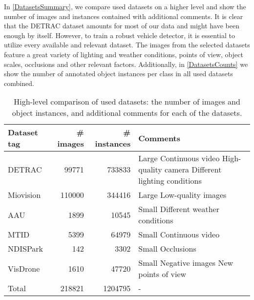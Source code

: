 In \autoref{DatasetsSummary}, we compare used datasets on a higher level and
show the number of images and instances contained with additional comments. It
is clear that the DETRAC dataset amounts for most of our
data and might have been enough by itself. However, to train a robust vehicle detector,
it is essential to utilize every available and relevant dataset. The
images from the selected datasets feature a great variety of lighting and
weather conditions, points of view, object scales, occlusions and other relevant factors.
Additionally, in \autoref{DatasetsCounts} we show the number of annotated object
instances per class in all used datasets combined.

\begin{table}[t]
\centering
\begin{tabular}{|l|rr|p{5cm}|}
    \hline
    Dataset tag & \# images & \# instances & Comments \\
    \hline
    DETRAC      &  \num{99771}  & \num{733833} & Large \newline Continuous video \newline High-quality camera \newline Different lighting conditions \\
    \hline
    Miovision   &  \num{110000} & \num{344416} & Large \newline Low-quality images \\
    \hline
    AAU         &    \num{1899} &  \num{10545} & Small \newline Different weather conditions \\
    \hline
    MTID        &    \num{5399} &  \num{64979} & Small \newline Continuous video \\
    \hline
    NDISPark    &     \num{142} &   \num{3302} & Small \newline Occlusions \\
    \hline
    VisDrone    &    \num{1610} &  \num{47720} & Small \newline Negative images \newline New points of view \\
    \hline
    \hline
    Total       &  \num{218821} & \num{1204795} & - \\
    \hline
\end{tabular}
\caption{High-level comparison of used datasets: the number of images and object instances, and additional comments for each of the datasets.}
\label{DatasetsSummary}
\end{table}

